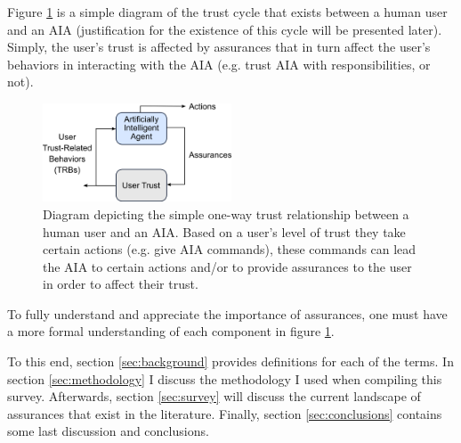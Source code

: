     Figure \ref{fig:SimpleTrust_one_way} is a simple diagram of the trust cycle that exists between a human user and an AIA (justification for the existence of this cycle will be presented later). Simply, the user's trust is affected by assurances that in turn affect the user's behaviors in interacting with the AIA (e.g. trust AIA with responsibilities, or not).

    \begin{figure}
        \centering
        \includegraphics[width=0.5\textwidth]{Figures/SimpleTrust_one_way.png}
        \caption{Diagram depicting the simple one-way trust relationship between a human user and an AIA. Based on a user's level of trust they take certain actions (e.g. give AIA commands), these commands can lead the AIA to certain actions and/or to provide assurances to the user in order to affect their trust.}
        \label{fig:SimpleTrust_one_way}
    \end{figure}

    To fully understand and appreciate the importance of assurances, one must have a more formal understanding of each component in figure \ref{fig:SimpleTrust_one_way}. %
   
   
   To this end, section \ref{sec:background} provides definitions for each of the terms. In section \ref{sec:methodology} I discuss the methodology I used when compiling this survey. Afterwards, section \ref{sec:survey} will discuss the current landscape of assurances that exist in the literature. Finally, section \ref{sec:conclusions} contains some last discussion and conclusions.
